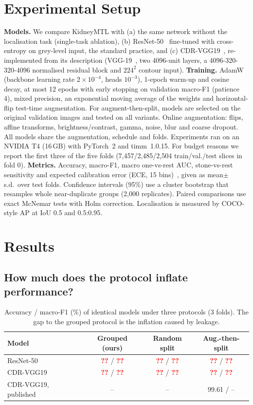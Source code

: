 \documentclass[conference]{IEEEtran}
\newcommand{\tbd}{\textcolor{red}{\textbf{??}}}            %
\begin{document}
\section{Experimental Setup}
\textbf{Models.} We compare KidneyMTL with (a) the same network without the localisation task (single-task
ablation), (b) ResNet-50~\cite{he2016resnet} fine-tuned with cross-entropy on grey-level input, the standard
practice, and (c) CDR-VGG19~\cite{devi2025cdr}, re-implemented from its description (VGG-19~\cite{simonyan2015vgg},
two 4096-unit layers, a 4096-320-320-4096 normalised residual block and $224^2$ contour input).
\textbf{Training.} AdamW (backbone learning rate $2{\times}10^{-4}$, heads $10^{-3}$), 1-epoch warm-up and cosine
decay, at most 12 epochs with early stopping on validation macro-F1 (patience 4), mixed precision, an
exponential moving average of the weights and horizontal-flip test-time augmentation. For augment-then-split,
models are selected on the original validation images and tested on all variants. Online augmentation:
flips, affine transforms, brightness/contrast, gamma, noise, blur and coarse dropout. All models share the
augmentation, schedule and folds. Experiments ran on an NVIDIA T4 (16\,GB) with PyTorch~2 and timm~1.0.15.
For budget reasons we report the first three of the five folds (7,457/2,485/2,504 train/val./test slices in fold 0).
\textbf{Metrics.} Accuracy, macro-F1, macro one-vs-rest AUC, stone-vs-rest sensitivity and expected calibration
error (ECE, 15 bins)~\cite{guo2017calibration}, given as mean$\pm$s.d.\ over test folds. Confidence intervals
(95\%) use a cluster bootstrap that resamples whole near-duplicate groups (2,000 replicates). Paired comparisons
use exact McNemar tests with Holm correction. Localisation is measured by COCO-style AP at IoU 0.5 and
0.5:0.95.

\section{Results}
\subsection{How much does the protocol inflate performance?}
\begin{table}[t]
\centering
\caption{Accuracy / macro-F1 (\%) of identical models under three protocols (3 folds). The gap to the grouped
protocol is the inflation caused by leakage.}
\label{tab:leakage}
\small\setlength{\tabcolsep}{3pt}
\begin{tabular}{lccc}
\toprule
Model & Grouped (ours) & Random split & Aug.-then-split \\
\midrule
ResNet-50 & \tbd{} / \tbd & \tbd{} / \tbd & \tbd{} / \tbd \\
CDR-VGG19 & \tbd{} / \tbd & \tbd{} / \tbd & \tbd{} / \tbd \\
\midrule
CDR-VGG19, published~\cite{devi2025cdr} & -- & -- & 99.61 / -- \\
\bottomrule
\end{tabular}
\end{table}
\end{document}
